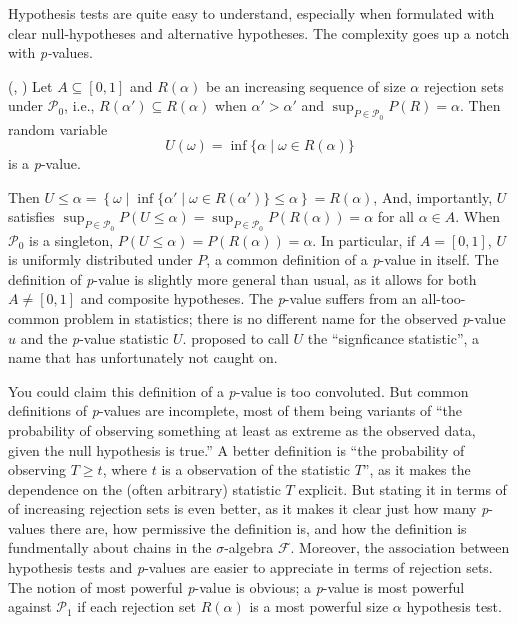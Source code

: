 Hypothesis tests are quite easy to understand, especially when formulated
with clear null-hypotheses and alternative hypotheses. The complexity
goes up a notch with \emph{p-}values.
\begin{definition}
\label{def:p-value}(\textcite[][Chapter 3.3]{Lehmann2005-sp}, \textcite{Bayarri2000-dt}) Let
$A\subseteq[0,1]$ and $R(\alpha)$ be an increasing sequence of size
$\alpha$ rejection sets under $\mathcal{P}_{0}$, i.e., $R(\alpha')\subseteq R(\alpha)$
when $\alpha'>\alpha'$ and $\sup_{P\in\mathcal{P}_{0}}P(R)=\alpha$.
Then random variable
\begin{equation}
U(\omega)=\inf\{\alpha\mid\omega\in R(\alpha)\}\label{eq:size p-value}
\end{equation}
is a \emph{p}-value. 
\end{definition}

Then $U\leq\alpha=\left\{ \omega\mid\inf\{\alpha'\mid\omega\in R(\alpha')\}\leq\alpha\right\} =R(\alpha)$,
And, importantly, $U$ satisfies $\sup_{P\in\mathcal{P}_{0}}P(U\leq\alpha)=\sup_{P\in\mathcal{P}_{0}}P(R(\alpha))=\alpha$
for all $\alpha\in A$. When $\mathcal{P}_{0}$ is a singleton, $P(U\leq\alpha)=P(R(\alpha))=\alpha$.
In particular, if $A=[0,1]$, $U$ is uniformly distributed under
$P$, a common definition of a \emph{p}-value in itself. The definition
of \emph{p}-value is slightly more general than usual, as it allows
for both $A\neq[0,1]$ and composite hypotheses. The \emph{p}-value
suffers from an all-too-common problem in statistics; there is no
different name for the observed \emph{p}-value $u$ and the \emph{p}-value
statistic $U$. \cite{Schweder1988-nh} proposed to call $U$ the
``signficance statistic'', a name that has unfortunately not caught
on. 

You could claim this definition of a \emph{p}-value is too convoluted.
But common definitions of\emph{ p}-values are incomplete, most of
them being variants of ``the probability of observing something at
least as extreme as the observed data, given the null hypothesis is
true.'' A better definition is ``the probability of observing $T\geq t$,
where $t$ is a observation of the statistic $T$'', as it makes
the dependence on the (often arbitrary) statistic $T$ explicit. But
stating it in terms of of increasing rejection sets is even better,
as it makes it clear just how many \emph{p}-values there are, how
permissive the definition is, and how the definition is fundmentally
about chains in the $\sigma$-algebra $\mathcal{F}$. Moreover, the
association between hypothesis tests and \emph{p}-values are easier
to appreciate in terms of rejection sets. The notion of most powerful
\emph{p}-value is obvious; a \emph{p}-value is most powerful against
$\mathcal{P}_{1}$ if each rejection set $R(\alpha)$ is a most powerful
size $\alpha$ hypothesis test. 

